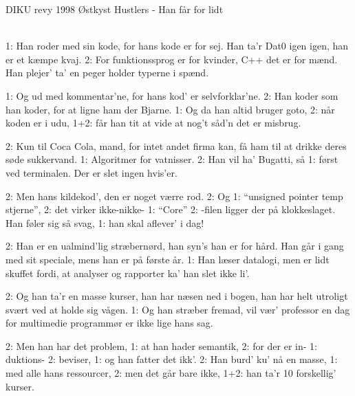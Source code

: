 {DIKU revy 1998}
{Østkyst Hustlers - Han får for lidt}
{
\\

1: Han roder med sin kode,
for hans kode er for sej. 
Han ta'r Dat0 igen igen, 
han er et kæmpe kvaj.
2: For funktionssprog er for kvinder, 
C++ det er for mænd.
Han plejer' ta' en peger
holder typerne i spænd.

1: Og ud med kommentar'ne,
for hans kod' er selvforklar'ne.
2: Han koder som han koder,
for at ligne ham der Bjarne.
1: Og da han altid bruger goto,
2: når koden er i udu, 
1+2: får han tit at vide 
at nog't såd'n det er misbrug.

2: Kun til Coca Cola, mand,
for intet andet firma kan, 
få ham til at drikke deres
søde sukkervand.
1: Algoritmer for vatnisser.
2: Han vil ha' Bugatti, så
1: først ved terminalen. 
Der er slet ingen hvis'er.

2: Men hans kildekod',
den er noget værre rod. 
2: Og 1: ``unsigned pointer temp stjerne'',
2: det virker ikke-nikke-
1: ``Core'' 2: -filen ligger der på klokkeslaget.
Han føler sig så svag,
1: han skal aflever' i dag! 


2: Han er en ualmind'lig stræbernørd,
han syn's han er for hård.
Han går i gang med sit speciale,
mens han er på første år.
1: Han læser datalogi,
men er lidt skuffet fordi,
at analyser og rapporter
ka' han slet ikke li'.

2: Og han ta'r en masse kurser,
han har næsen ned i bogen,
han har helt utroligt svært
ved at holde sig vågen.
1: Og han stræber fremad,
vil vær' professor en dag
for multimedie programmør er
ikke lige hans sag.

2: Men han har det problem,
1: at han hader semantik,
2: for der er in- 1: duktions- 2: beviser,
1: og han fatter det ikk'.
2: Han burd' ku' nå en masse,
1: med alle hans ressourcer,
2: men det går bare ikke,
1+2: han ta'r 10 forskellig' kurser.

}
